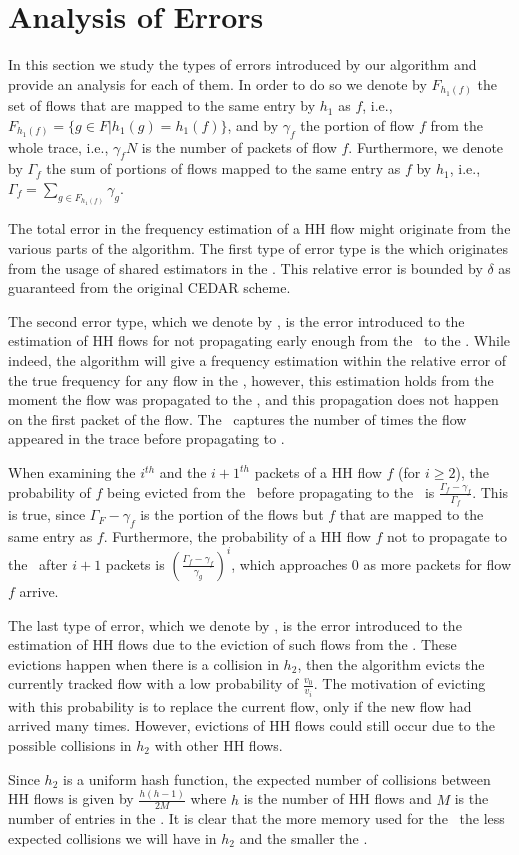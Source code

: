 \section{Analysis of Errors}
\label{sec:theory}
In this section we study the types of errors introduced by our algorithm and provide an analysis for each of them. In order to do so we denote by $F_{h_1(f)}$ the set of flows that are mapped to the same entry by $h_1$ as $f$, i.e., $F_{h_1(f)} = \{g\in F | h_1(g)=h_1(f)\}$, and by $\gamma_f$ the portion of flow $f$ from the whole trace, i.e., $\gamma_f N$ is the number of packets of flow $f$. Furthermore, we denote by $\Gamma_f$ the sum of portions of flows mapped to the same entry as $f$ by $h_1$, i.e., $\Gamma_f=\sum_{g\in F_{h_1(f)}} \gamma_g$.

The total error in the frequency estimation of a HH flow might originate from the various parts of the algorithm. The first type of error type is the \textit{\ee} which originates from the usage of shared estimators in the \sea. This relative error is bounded by $\delta$ as guaranteed from the original CEDAR scheme.

The second error type, which we denote by \textit{\pe}, is the error introduced to the estimation of HH flows for not propagating early enough from the \sfa\ to the \cs. While indeed, the algorithm will give a frequency estimation within the relative error of the true frequency for any flow in the \cs, however, this estimation holds from the moment the flow was propagated to the \cs, and this propagation does not happen on the first packet of the flow. The \pe\ captures the number of times the flow appeared in the trace before propagating to \cs.

When examining the $i^{th}$ and the ${i+1}^{th}$ packets of a HH flow $f$ (for $i\geq 2$), the probability of $f$ being evicted from the \sfa\ before propagating to the \cs\ is $\frac{\Gamma_f-\gamma_f}{\Gamma_f}$. This is true, since $\Gamma_F-\gamma_f$ is the portion of the flows but $f$ that are mapped to the same entry as $f$. Furthermore, the probability of a HH flow $f$ not to propagate to the \cs\ after $i+1$ packets is $\left(\frac{\Gamma_f-\gamma_f}{\gamma_g}\right)^{i}$, which approaches $0$ as more packets for flow $f$ arrive.

The last type of error, which we denote by \textit{\eve}, is the error introduced to the estimation of HH flows due to the eviction of such flows from the \cs. These evictions happen when there is a collision in $h_2$, then the algorithm evicts the currently tracked flow with a low probability of $\frac{v_0}{v_i}$. The motivation of evicting with this probability is to replace the current flow, only if the new flow had arrived many times. However, evictions of HH flows could still occur due to the possible collisions in $h_2$ with other HH flows.

Since $h_2$ is a uniform hash function, the expected number of collisions between HH flows is given by $\frac{h(h-1)}{2M}$ where $h$ is the number of HH flows and $M$ is the number of entries in the \cs. It is clear that the more memory used for the \cs\ the less expected collisions we will have in $h_2$ and the smaller the \eve.
